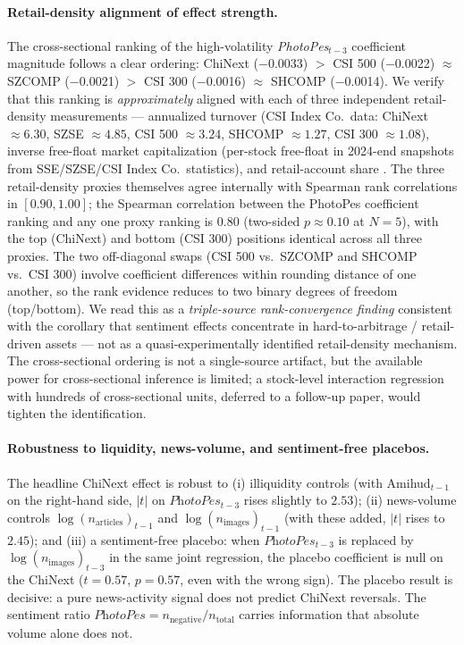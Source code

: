\documentclass[AER]{AEA}
\begin{document}
\paragraph{Retail-density alignment of effect strength.} The cross-sectional ranking of the high-volatility \textit{PhotoPes}$_{t-3}$ coefficient magnitude follows a clear ordering: ChiNext ($-$0.0033) $>$ CSI 500 ($-$0.0022) $\approx$ SZCOMP ($-$0.0021) $>$ CSI 300 ($-$0.0016) $\approx$ SHCOMP ($-$0.0014). We verify that this ranking is \emph{approximately} aligned with each of three independent retail-density measurements --- annualized turnover (CSI Index Co.\ data: ChiNext $\approx 6.30$, SZSE $\approx 4.85$, CSI 500 $\approx 3.24$, SHCOMP $\approx 1.27$, CSI 300 $\approx 1.08$), inverse free-float market capitalization (per-stock free-float in 2024-end snapshots from SSE/SZSE/CSI Index Co.\ statistics), and retail-account share \citep{liu2019size,jones2025retail}. The three retail-density proxies themselves agree internally with Spearman rank correlations in $[0.90, 1.00]$; the Spearman correlation between the PhotoPes coefficient ranking and any one proxy ranking is $0.80$ (two-sided $p \approx 0.10$ at $N=5$), with the top (ChiNext) and bottom (CSI 300) positions identical across all three proxies. The two off-diagonal swaps (CSI 500 vs.\ SZCOMP and SHCOMP vs.\ CSI 300) involve coefficient differences within rounding distance of one another, so the rank evidence reduces to two binary degrees of freedom (top/bottom). We read this as a \emph{triple-source rank-convergence finding} consistent with the \citet{baker2007investor} corollary that sentiment effects concentrate in hard-to-arbitrage / retail-driven assets --- not as a quasi-experimentally identified retail-density mechanism. The cross-sectional ordering is not a single-source artifact, but the available power for cross-sectional inference is limited; a stock-level interaction regression with hundreds of cross-sectional units, deferred to a follow-up paper, would tighten the identification.

\paragraph{Robustness to liquidity, news-volume, and sentiment-free placebos.} The headline ChiNext effect is robust to (i) \citet{amihud2002illiquidity} illiquidity controls (with Amihud$_{t-1}$ on the right-hand side, $|t|$ on $\textit{PhotoPes}_{t-3}$ rises slightly to $2.53$); (ii) news-volume controls $\log(n_{\text{articles}})_{t-1}$ and $\log(n_{\text{images}})_{t-1}$ (with these added, $|t|$ rises to $2.45$); and (iii) a sentiment-free placebo: when $\textit{PhotoPes}_{t-3}$ is replaced by $\log(n_{\text{images}})_{t-3}$ in the same joint regression, the placebo coefficient is null on the ChiNext ($t = 0.57$, $p = 0.57$, even with the wrong sign). The placebo result is decisive: a pure news-activity signal does not predict ChiNext reversals. The sentiment ratio $\textit{PhotoPes} = n_{\text{negative}} / n_{\text{total}}$ carries information that absolute volume alone does not.
\end{document}
